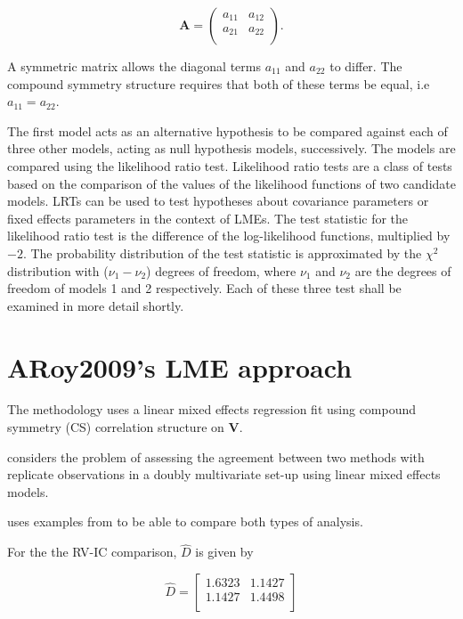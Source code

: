 \documentclass[12pt, a4paper]{report}
\theoremstyle{plain}
\theoremstyle{definition}
\theoremstyle{remark}
\begin{document}
	\[
	\boldsymbol{A} = \left( \begin{array}{cc}
	a_{11} & a_{12}  \\
	a_{21} & a_{22}  \\
	\end{array}\right).
	\]
	
	A symmetric matrix allows the diagonal terms $a_{11}$ and $a_{22}$ to differ. The compound symmetry structure requires that both of these terms be equal, i.e $a_{11} = a_{22}$.
	
	The first model acts as an alternative hypothesis to be compared against each of three other models, acting as null hypothesis models, successively. The models are compared using the likelihood ratio test. Likelihood ratio tests are a class of tests based on the comparison of the values of the likelihood functions of two candidate models. LRTs can be used to test hypotheses about covariance parameters or fixed effects parameters in the context of LMEs. The test statistic for the likelihood ratio test is the difference of the log-likelihood functions, multiplied by $-2$.
	The probability distribution of the test statistic is approximated by the $\chi^2$ distribution with ($\nu_{1} - \nu_{2}$) degrees of freedom, where $\nu_{1}$ and $\nu_{2}$ are the degrees of freedom of models 1 and 2 respectively. Each of these three test shall be examined in more detail shortly.

	\section{ARoy2009's LME approach}
	
	
	The methodology uses a linear mixed effects regression fit using
	compound symmetry (CS) correlation structure on \textbf{V}.
	
	
	
	\bigskip
	
	\citet{AARoy20092009} considers the problem of assessing the agreement
	between two methods with replicate observations in a doubly
	multivariate set-up using linear mixed effects models.
	
	
	\citet{AARoy20092009} uses examples from \citet{BA86} to be able to
	compare both types of analysis.
	
	
	
	For the the RV-IC comparison, $\hat{D}$ is given by
	
	
	\begin{equation}
	\hat{D}= \left[ \begin{array}{cc}
	1.6323 & 1.1427  \\
	1.1427 & 1.4498 \\
	\end{array} \right]
	\end{equation}
	
\end{document}
